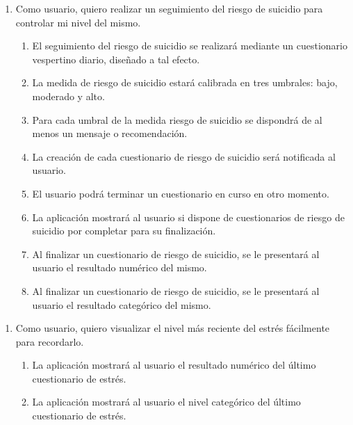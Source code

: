         \begin{enumerate}[resume=req-usuario,label=\textbf{\texttt{RU-\arabic*}}]
            \item Como usuario, quiero realizar un seguimiento del riesgo de suicidio para controlar mi nivel del mismo.
            \begin{enumerate}[resume=req-funcionales,label=\textbf{\texttt{RF-\arabic*}}]
                \item El seguimiento del riesgo de suicidio se realizará mediante un cuestionario vespertino diario, diseñado a tal efecto.
                \item La medida de riesgo de suicidio estará calibrada en tres umbrales: bajo, moderado y alto.
                \item Para cada umbral de la medida riesgo de suicidio se dispondrá de al menos un mensaje o recomendación.
                \item La creación de cada cuestionario de riesgo de suicidio será notificada al usuario.
                \item El usuario podrá terminar un cuestionario en curso en otro momento.
                \item La aplicación mostrará al usuario si dispone de cuestionarios de riesgo de suicidio por completar para su finalización.
                \item Al finalizar un cuestionario de riesgo de suicidio, se le presentará al usuario el resultado numérico del mismo.
                \item Al finalizar un cuestionario de riesgo de suicidio, se le presentará al usuario el resultado categórico del mismo.
            \end{enumerate}
        \end{enumerate}
        \begin{enumerate}[resume=req-usuario,label=\textbf{\texttt{RU-\arabic*}}]
            \item Como usuario, quiero visualizar el nivel más reciente del estrés fácilmente para recordarlo.
            \begin{enumerate}[resume=req-funcionales,label=\textbf{\texttt{RF-\arabic*}}]
                \item La aplicación mostrará al usuario el resultado numérico del último cuestionario de estrés.
                \item La aplicación mostrará al usuario el nivel categórico del último cuestionario de estrés.
            \end{enumerate}
        \end{enumerate}
